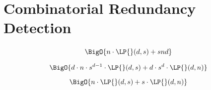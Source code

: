 \section{Combinatorial Redundancy Detection}
\begin{frame}\frametitle{\insertsection}\justifying
{}
\vspace{.3cm}
\begin{displaymath}
\BigO{n\cdot\LP{}(d,s) + snd}
\end{displaymath}
\vspace{.3cm}

\vspace{.3cm}
\begin{displaymath}
\BigO{d\cdot n\cdot s^{d-1}\cdot\LP{}(d,s) + d\cdot s^d\cdot \LP{}(d,n)}
\end{displaymath}
\vspace{.3cm}

\vspace{.3cm}
\begin{displaymath}
\BigO{n\cdot\LP{}(d,s) + s\cdot\LP{}(d,n)}
\end{displaymath}
\end{frame}
